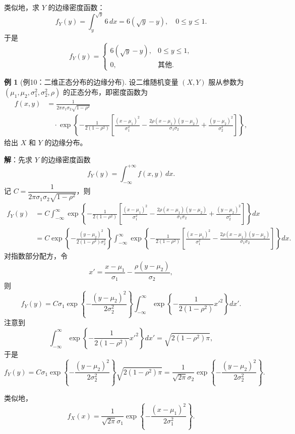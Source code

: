 \documentclass[11pt,a4paper]{report}
\theoremstyle{definition}
\newtheorem{example}{例}[chapter]
\begin{document}
类似地，求 $Y$ 的边缘密度函数：
\[
f_{Y}(y)=\int_{y}^{\sqrt{y}}6\,dx=6(\sqrt{y}-y),\quad 0\leq y\leq 1.
\]
于是
\[
f_{Y}(y)=
\begin{cases}
6(\sqrt{y}-y), & 0\leq y\leq 1, \\[0.3em]
0, & \text{其他}.
\end{cases}
\]

\begin{example}[例10：二维正态分布的边缘分布]
设二维随机变量 $(X,Y)$ 服从参数为 $(\mu_{1},\mu_{2},\sigma_{1}^{2},\sigma_{2}^{2},\rho)$ 的正态分布，即密度函数为
\[
\begin{aligned}
f(x,y)&=\frac{1}{2\pi\sigma_{1}\sigma_{2}\sqrt{1-\rho^{2}}} \\
&\quad\cdot\exp\left\{-\frac{1}{2(1-\rho^{2})}\left[\frac{(x-\mu_{1})^{2}}{\sigma_{1}^{2}}-\frac{2\rho(x-\mu_{1})(y-\mu_{2})}{\sigma_{1}\sigma_{2}}+\frac{(y-\mu_{2})^{2}}{\sigma_{2}^{2}}\right]\right\},
\end{aligned}
\]
给出 $X$ 和 $Y$ 的边缘分布。
\end{example}

\textbf{解}：先求 $Y$ 的边缘密度函数
\[
f_{Y}(y)=\int_{-\infty}^{+\infty}f(x,y)\,dx.
\]
记 $C=\dfrac{1}{2\pi\sigma_{1}\sigma_{2}\sqrt{1-\rho^{2}}}$，则
\begin{align*}
f_{Y}(y)&=C\int_{-\infty}^{\infty}\exp\left\{-\frac{1}{2(1-\rho^{2})}\left[\frac{(x-\mu_{1})^{2}}{\sigma_{1}^{2}}-\frac{2\rho(x-\mu_{1})(y-\mu_{2})}{\sigma_{1}\sigma_{2}}+\frac{(y-\mu_{2})^{2}}{\sigma_{2}^{2}}\right]\right\}dx \\
&=C\exp\left\{-\frac{(y-\mu_{2})^{2}}{2(1-\rho^{2})\sigma_{2}^{2}}\right\}\int_{-\infty}^{\infty}\exp\left\{-\frac{1}{2(1-\rho^{2})}\left[\frac{(x-\mu_{1})^{2}}{\sigma_{1}^{2}}-\frac{2\rho(x-\mu_{1})(y-\mu_{2})}{\sigma_{1}\sigma_{2}}\right]\right\}dx.
\end{align*}
对指数部分配方，令
\[
x'=\frac{x-\mu_{1}}{\sigma_{1}}-\frac{\rho(y-\mu_{2})}{\sigma_{2}},
\]
则
\[
f_{Y}(y)=C\sigma_{1}\exp\left\{-\frac{(y-\mu_{2})^{2}}{2\sigma_{2}^{2}}\right\}\int_{-\infty}^{\infty}\exp\left\{-\frac{1}{2(1-\rho^{2})}x'^{2}\right\}dx'.
\]
注意到
\[
\int_{-\infty}^{\infty}\exp\left\{-\frac{1}{2(1-\rho^{2})}x'^{2}\right\}dx'=\sqrt{2(1-\rho^{2})\pi},
\]
于是
\[
f_{Y}(y)=C\sigma_{1}\exp\left\{-\frac{(y-\mu_{2})^{2}}{2\sigma_{2}^{2}}\right\}\sqrt{2(1-\rho^{2})\pi}
=\frac{1}{\sqrt{2\pi}\sigma_{2}}\exp\left\{-\frac{(y-\mu_{2})^{2}}{2\sigma_{2}^{2}}\right\}.
\]

类似地，
\[
f_{X}(x)=\frac{1}{\sqrt{2\pi}\sigma_{1}}\exp\left\{-\frac{(x-\mu_{1})^{2}}{2\sigma_{1}^{2}}\right\}.
\]
\end{document}
